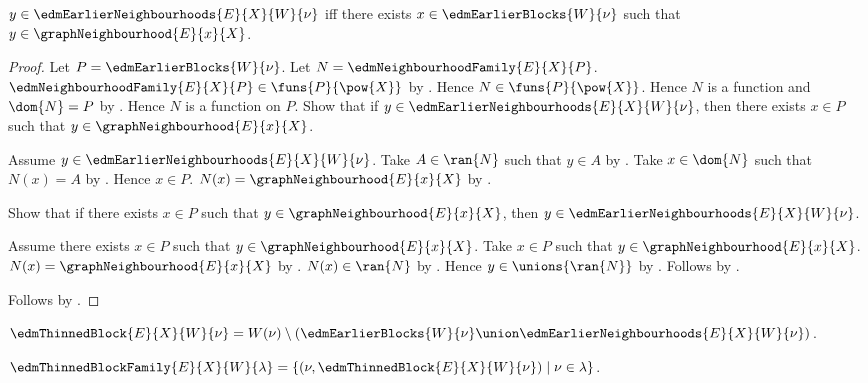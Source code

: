 \begin{proposition}\label{edm_earlier_neighbourhoods_iff}
    $y\in\edmEarlierNeighbourhoods{E}{X}{W}{\nu}$ iff
        there exists $x\in\edmEarlierBlocks{W}{\nu}$ such that
            $y\in\graphNeighbourhood{E}{x}{X}$.
\end{proposition}
\begin{proof}
    Let $P=\edmEarlierBlocks{W}{\nu}$.
    Let $N=\edmNeighbourhoodFamily{E}{X}{P}$.
    $\edmNeighbourhoodFamily{E}{X}{P}\in\funs{P}{\pow{X}}$ by
        .
    Hence $N\in\funs{P}{\pow{X}}$.
    Hence $N$ is a function and $\dom{N}=P$ by
        .
    Hence $N$ is a function on $P$.
    Show that if $y\in\edmEarlierNeighbourhoods{E}{X}{W}{\nu}$, then
        there exists $x\in P$ such that
            $y\in\graphNeighbourhood{E}{x}{X}$.
    \begin{subproof}
        Assume $y\in\edmEarlierNeighbourhoods{E}{X}{W}{\nu}$.
        Take $A\in\ran{N}$ such that $y\in A$ by
            .
        Take $x\in\dom{N}$ such that $N(x)=A$ by
            .
        Hence $x\in P$.
        $N(x)=\graphNeighbourhood{E}{x}{X}$ by
            .
    \end{subproof}
    Show that if there exists $x\in P$ such that
            $y\in\graphNeighbourhood{E}{x}{X}$, then
        $y\in\edmEarlierNeighbourhoods{E}{X}{W}{\nu}$.
    \begin{subproof}
        Assume there exists $x\in P$ such that
            $y\in\graphNeighbourhood{E}{x}{X}$.
        Take $x\in P$ such that
            $y\in\graphNeighbourhood{E}{x}{X}$.
        $N(x)=\graphNeighbourhood{E}{x}{X}$ by
            .
        $N(x)\in\ran{N}$ by .
        Hence $y\in\unions{\ran{N}}$ by .
        Follows by .
    \end{subproof}
    Follows by \auto.
\end{proof}

\begin{definition}\label{edm_thinned_block}
    $\edmThinnedBlock{E}{X}{W}{\nu}
        =W(\nu)\setminus
            (\edmEarlierBlocks{W}{\nu}\union
                \edmEarlierNeighbourhoods{E}{X}{W}{\nu})$.
\end{definition}

\begin{definition}\label{edm_thinned_block_family}
    $\edmThinnedBlockFamily{E}{X}{W}{\lambda}
        =\{(\nu,\edmThinnedBlock{E}{X}{W}{\nu})\mid\nu\in\lambda\}$.
\end{definition}

